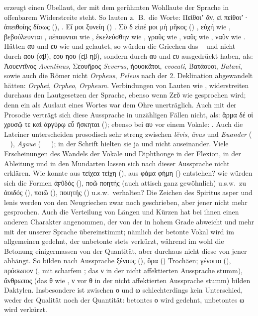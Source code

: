  erzeugt einen Übellaut, der mit dem gerühmten Wohllaute der
 Sprache in offenbarem Widerstreite steht.
So lauten z.~B.\ die Worte: Πείθοιʼ ἄν, εἰ πείθοιʼ· ἀπειθοίης δἴσως
(), .
Εἴ μοι ξυνείη () .
Σὺ δ εἰπέ μοι μὴ μῆκος () ,
εὐχή wie , βεβούλευνται , πέπαυνται wie
, ἐκελεύσθην wie , γραῦς wie , ναῦς
wie , ναῦν wie .
Hätten αυ und ευ wie  und  gelautet, so würden die Griechen das
\  und  nicht durch αου (αβ), εου ηου (εβ
ηβ), sondern durch αυ und ευ ausgedrückt haben, als: Ἀουεντῖνος \emph{Aventinus},
Σεουῆρος \emph{Severus}, ἠουοκᾶτοι, \emph{evocati}, Βατάουοι, \emph{Batavi}, sowie auch die Römer
nicht \emph{Orpheus}, \emph{Peleus} nach der 2. Deklination abgewandelt hätten:
\emph{Orphei}, \emph{Orpheo}, \emph{Orpheum}.
Verbindungen von Lauten wie ,  widerstreiten durchaus den
Lautgesetzen der  Sprache, ebenso wenn Ζεῦ wie 
gesprochen wird; denn ein  als Auslaut eines Wortes war dem
 Ohre unerträglich.
Auch mit der Prosodie verträgt sich diese Aussprache in unzähligen Fällen nicht,
als: ἅρμα δέ οἱ χρυσῷ τε καὶ ἀργύρῳ εὖ ἤσκηται  (); ebenso bei
αυ vor einem Vokale: .
Auch die Lateiner unterscheiden prosodisch sehr streng zwischen \emph{lĕvis},
\emph{ăvus} und
\emph{Euander} ({\thirdiarygreek{}  }), \emph{Agaue} ({\thirdiarygreek{}  }); in der Schrift hielten sie ja  und
 nicht auseinander.
Viele Erscheinungen des Wandels der Vokale und Diphthonge in der Flexion, in der
Ableitung und in den Mundarten lassen sich nach dieser Aussprache nicht
erklären.
Wie konnte aus τείχεα τείχη (), aus φάμα φήμη ()
entstehen? wie würden sich die Formen ἀϝῦδός (), ποῶ ποητής (auch attisch
ganz gewöhnlich) u.s.w.~zu ἀοιδός (), ποιῶ (), ποιητής
() u.s.w.~verhalten?
Die Zeichen des Spiritus asper und lenis werden von den Neugriechen zwar noch
geschrieben, aber jener nicht mehr gesprochen.
Auch die Verteilung von Längen und Kürzen hat bei ihnen einen anderen Charakter
angenommen, der von der  in hohem Grade abweicht
und mehr mit der unserer Sprache übereinstimmt; nämlich der betonte Vokal wird
im allgemeinen gedehnt, der unbetonte stets verkürzt, während im
 wohl die Betonung einigermassen von der
Quantität, aber durchaus nicht diese von jener abhängt.
So bilden nach  Aussprache ξένους (), ὅρα
() Trochäen; γένοιτο (), πρόσωπον (, mit
scharfem ; das ν in der nicht affektierten Aussprache stumm), ἄνθρωπος
{} (das θ wie  , ν vor θ in der nicht
affektierten Aussprache stumm) bilden Daktylen.
Insbesondere ist zwischen ο und ω schlechterdings kein Unterschied, weder der
Qualität noch der Quantität: betontes ο wird gedehnt, unbetontes ω wird
verkürzt.

